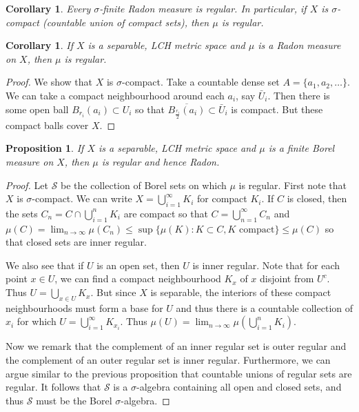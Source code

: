 \documentclass[11pt]{amsart}
\newtheorem{proposition}[theorem]{Proposition}
\newtheorem{corollary}[theorem]{Corollary}
\theoremstyle{definition}
\numberwithin{equation}{section}
\begin{document}
\begin{corollary}
    Every $\sigma$-finite Radon measure is regular. In particular, if $X$ is $\sigma$-compact (countable union of compact sets), then $\mu$ is regular.
\end{corollary}
\begin{corollary}
    If $X$ is a separable, LCH metric space and $\mu$ is a Radon measure on $X$, then $\mu$ is regular.
\end{corollary}
\begin{proof}
    We show that $X$ is $\sigma$-compact. Take a countable dense set $A=\{a_1,a_2,\ldots\}$. We can take a compact neighbourhood around each $a_i$, say $\bar U_i$. Then there is some open ball $B_{r_i}(a_i)\subset U_i$ so that $\overline{B_{\frac{r_i}{2}}(a_i)}\subset \bar U_i$ is compact. But these compact balls cover $X$.
\end{proof}
\begin{proposition}
    If $X$ is a separable, LCH metric space and $\mu$ is a finite Borel measure on $X$, then $\mu$ is regular and hence Radon.
\end{proposition}
\begin{proof}
    Let $\mathcal S$ be the collection of Borel sets on which $\mu$ is regular. First note that $X$ is $\sigma$-compact. We can write $X=\bigcup_{i=1}^\infty K_i$ for compact $K_i$. If $C$ is closed, then the sets $C_n=C\cap \bigcup_{i=1}^nK_i$ are compact so that $C=\bigcup_{n=1}^\infty C_n$ and $\mu(C)=\lim_{n\to\infty}\mu(C_n)\le\sup\{\mu(K):K\subset C,K\text{ compact}\}\le\mu(C)$ so that closed sets are inner regular. 

    We also see that if $U$ is an open set, then $U$ is inner regular. Note that for each point $x\in U$, we can find a compact neighbourhood $K_x$ of $x$ disjoint from $U^c$. Thus $U=\bigcup_{x\in U}K_x$. But since $X$ is separable, the interiors of these compact neighbourhoods must form a base for $U$ and thus there is a countable collection of $x_i$ for which $U=\bigcup_{i=1}^\infty K_{x_i}$. Thus $\mu(U)=\lim_{n\to\infty}\mu(\bigcup_{i=1}^nK_i)$.

    Now we remark that the complement of an inner regular set is outer regular and the complement of an outer regular set is inner regular. Furthermore, we can argue similar to the previous proposition that countable unions of regular sets are regular. It follows that $\mathcal S$ is a $\sigma$-algebra containing all open and closed sets, and thus $\mathcal S$ must be the Borel $\sigma$-algebra.
\end{proof}
\end{document}
